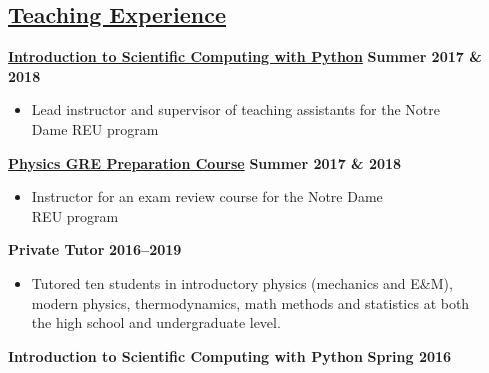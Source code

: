 \documentclass[margin]{res}
\begin{document}
\begin{resume}
    


\section{\href{https://www3.nd.edu/~brose3/\#classes}{Teaching Experience}}\label{teaching}
\textbf{\href{https://www3.nd.edu/~brose3/2017reu-cmp}{Introduction to Scientific Computing with Python}} \hfill{} \textbf{Summer 2017 \& 2018}
\begin{itemize}\itemsep -2pt
    \item[] Lead instructor and supervisor of teaching assistants for the Notre \\Dame REU program
    \end{itemize} \vspace{-12pt}
\textbf{\href{https://www3.nd.edu/~brose3/2017reu-gre}{Physics GRE Preparation Course}} \hfill{} \textbf{Summer 2017 \& 2018}
\begin{itemize}\itemsep -2pt
    \item[] Instructor for an exam review course for the Notre Dame\\REU program
    \end{itemize} \vspace{-12pt}
\textbf{Private Tutor} \hfill \textbf{2016--2019}
\begin{itemize}\itemsep -2pt
    \item[] Tutored ten students in introductory physics (mechanics and E\&M),\\modern physics, thermodynamics, math methods and statistics at both\\the high school and undergraduate level.
    \end{itemize} \vspace{-12pt}
\textbf{Introduction to Scientific Computing with Python} \hfill{} \textbf{Spring 2016}

\end{resume}
\end{document}
